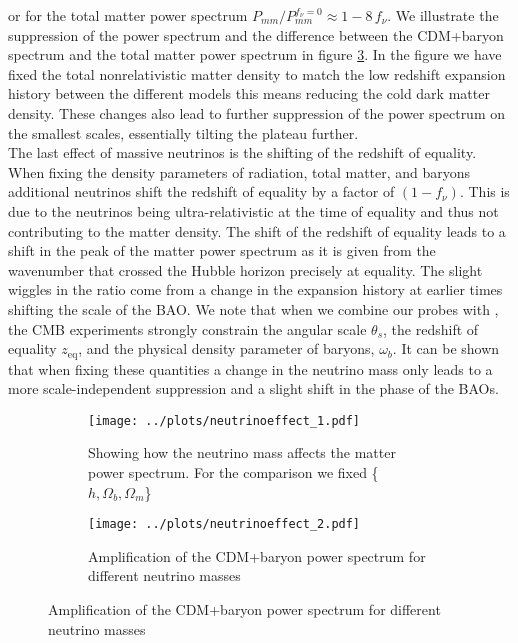 \documentclass[../main.tex]{subfiles}
\begin{document}
or for the total matter power spectrum $P_{mm}/P_{mm}^{f_\nu=0} \approx 1- 8\,f_\nu$. We illustrate the suppression of the power spectrum and the difference between the CDM+baryon spectrum and the total matter power spectrum in figure \ref{fig:Mneutrino_effect}. In the figure we have fixed the total nonrelativistic matter density to match the low redshift expansion history between the different models this means reducing the cold dark matter density. These changes also lead to further suppression of the power spectrum on the smallest scales, essentially tilting the plateau further.\\
The last effect of massive neutrinos is the shifting of the redshift of equality. When fixing the density parameters of radiation, total matter, and baryons additional neutrinos shift the redshift of equality by a factor of $(1-f_\nu)$. This is due to the neutrinos being ultra-relativistic at the time of equality and thus not contributing to the matter density. The shift of the redshift of equality leads to a shift in the peak of the matter power spectrum as it is given from the wavenumber that crossed the Hubble horizon precisely at equality. The slight wiggles in the ratio come from a change in the expansion history at earlier times shifting the scale of the BAO. We note that when we combine our \Euclid probes with \Planck, the CMB experiments strongly constrain the angular scale $\theta_s$, the redshift of equality $z_\mathrm{eq}$, and the physical density parameter of baryons, $\omega_b$. It can be shown that when fixing these quantities a change in the neutrino mass only leads to a more scale-independent suppression and a slight shift in the phase of the BAOs.
\begin{figure}
    \centering
    \caption{The effect of changing Neff when fixing different quantities as explained in the Text. The Ratios were multiplied with a factor to better differentiate between them.}
    \begin{subfigure}[b]{0.49\textwidth}
        \centering
        \texttt{[image: ../plots/neutrinoeffect\_1.pdf]}
        \caption{Showing how the neutrino mass affects the matter power spectrum. For the comparison we fixed \{$h,\Omega_b,\Omega_m$\}}
        \label{fig:mnu_suppression}
    \end{subfigure}
    \hfill
    \begin{subfigure}[b]{0.49\textwidth}
        \centering
        \texttt{[image: ../plots/neutrinoeffect\_2.pdf]}
        \caption{Amplification of the CDM+baryon power spectrum for different neutrino masses}
        \label{fig:PcbvPmm}  
    \end{subfigure}
       \label{fig:Mneutrino_effect} 
\end{figure}
\end{document}
